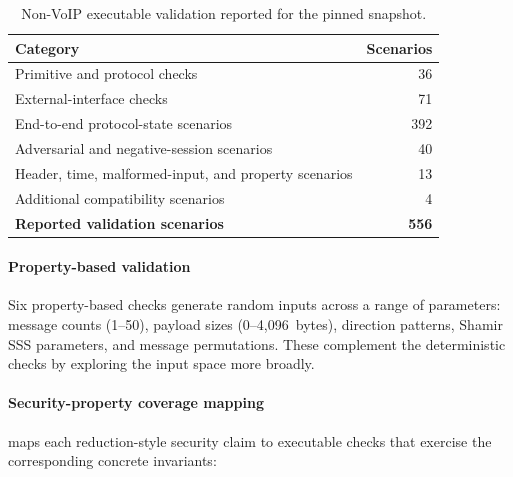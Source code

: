 \documentclass[preprint,12pt]{elsarticle}
\theoremstyle{definition}
\begin{document}
\begin{table}[H]
\centering
\caption{Non-VoIP executable validation reported for the pinned snapshot.}\label{tab:tests}
\small
\begin{tabularx}{\textwidth}{@{}Xr@{}}
\toprule
Category & Scenarios \\
\midrule
Primitive and protocol checks & 36 \\
External-interface checks & 71 \\
End-to-end protocol-state scenarios & 392 \\
Adversarial and negative-session scenarios & 40 \\
Header, time, malformed-input, and property scenarios & 13 \\
Additional compatibility scenarios & 4 \\
\midrule
\textbf{Reported validation scenarios} & \textbf{556} \\
\bottomrule
\end{tabularx}
\end{table}

\paragraph{Property-based validation}
Six property-based checks generate random inputs across a range of parameters:
message counts (1--50), payload sizes (0--4{,}096~bytes), direction patterns,
Shamir SSS parameters, and message permutations. These complement the
deterministic checks by exploring the input space more broadly.

\paragraph{Security-property coverage mapping}
 maps each reduction-style security claim to executable
checks that exercise the corresponding concrete invariants:
\end{document}

